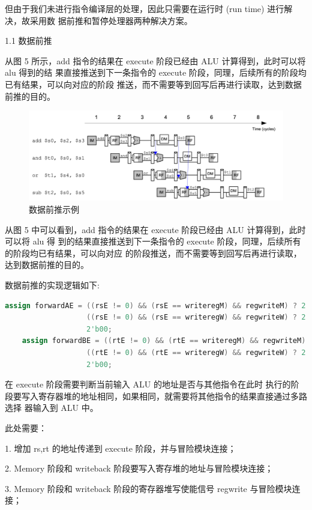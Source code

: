 但由于我们未进行指令编译层的处理，因此只需要在运行时 (run time) 进行解决，故采用数
据前推和暂停处理器两种解决方案。

1.1 数据前推

从图 5 所示，add 指令的结果在 execute 阶段已经由 ALU 计算得到，此时可以将 alu 得到的结
果直接推送到下一条指令的 execute 阶段，同理，后续所有的阶段均已有结果，可以向对应的阶段
推送，而不需要等到回写后再进行读取，达到数据前推的目的。
\begin{figure}[ht]
	\centering
	\includegraphics[width=0.75\linewidth]{figure/数据前推示例.png}
	\caption{数据前推示例}
	\label{fig:data_forward_example}
	\end{figure}

从图 5 中可以看到，add 指令的结果在 execute 阶段已经由 ALU 计算得到，此时可以将 alu 得
到的结果直接推送到下一条指令的 execute 阶段，同理，后续所有的阶段均已有结果，可以向对应
的阶段推送，而不需要等到回写后再进行读取，达到数据前推的目的。

数据前推的实现逻辑如下:	
\begin{lstlisting}[language=Verilog,caption={数据前推},label={lst:data_forward}]
	assign forwardAE = ((rsE != 0) && (rsE == writeregM) && regwriteM) ? 2'b10 :
                   ((rsE != 0) && (rsE == writeregW) && regwriteW) ? 2'b01 :
                   2'b00;
	assign forwardBE = ((rtE != 0) && (rtE == writeregM) && regwriteM) ? 2'b10 :
                   ((rtE != 0) && (rtE == writeregW) && regwriteW) ? 2'b01 :
                   2'b00;

\end{lstlisting}

在 execute 阶段需要判断当前输入 ALU 的地址是否与其他指令在此时
执行的阶段要写入寄存器堆的地址相同，如果相同，就需要将其他指令的结果直接通过多路选择
器输入到 ALU 中。

此处需要：

1. 增加 rs,rt 的地址传递到 execute 阶段，并与冒险模块连接；

2. Memory 阶段和 writeback 阶段要写入寄存堆的地址与冒险模块连接；

3. Memory 阶段和 writeback 阶段的寄存器堆写使能信号 regwrite 与冒险模块连接；

